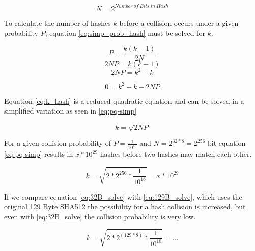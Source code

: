      \begin{equation*}
         N = 2^{Number\ of\ Bits\ in\ Hash}
     \end{equation*}
     

     
     To calculate the number of hashes $k$ before a collision occurs under a given probability $P$, equation \ref{eq:simp_prob_hash} must be solved for $k$.
     
     \begin{equation*}
         P = \frac{k(k - 1)}{2N}
     \end{equation*}
     \begin{equation*}
         2NP = k (k - 1)
     \end{equation*}
     \begin{equation*}
         2NP = k^2 - k
     \end{equation*}

     \begin{equation}
        \label{eq:k_hash}
         0 = k^2 - k - 2NP
     \end{equation}
     
     Equation \ref{eq:k_hash} is a reduced quadratic equation and can be solved in a simplified variation as seen in \ref{eq:pq-simp}
     
     \begin{equation}
         \label{eq:pq-simp}
         k = \sqrt{2NP}
     \end{equation}
     
     For a given collision probability of $P = \frac{1}{10^{18}}$ and $N = 2^{32 * 8} = 2^{256}$ bit equation \ref{eq:pq-simp} results in $x * 10^{29}$ hashes before two hashes may match each other.
     
     \begin{equation}
         \label{eq:32B_solve}
         k = \sqrt{2 * 2^{256} * \frac{1}{10^{18}}} = x * 10^{29}
     \end{equation}
     
     If we compare equation \ref{eq:32B_solve} with \ref{eq:129B_solve}, which uses the original 129 Byte SHA512 the possibility for a hash collision is increased, but even with \ref{eq:32B_solve} the collision probability is very low.
     
     \begin{equation}
         \label{eq:129B_solve}
         k = \sqrt{2 * 2^{(129 * 8)} * \frac{1}{10^{18}}} = ...
     \end{equation}
     
